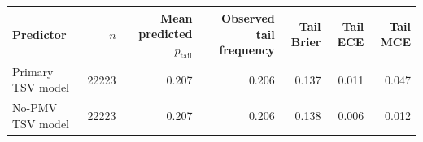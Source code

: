 \begin{tabular}{lrrrrrr}
\toprule
Predictor & $n$ & Mean predicted $p_{\mathrm{tail}}$ & Observed tail frequency & Tail Brier & Tail ECE & Tail MCE \\
\midrule
Primary TSV model & 22223 & 0.207 & 0.206 & 0.137 & 0.011 & 0.047 \\
No-PMV TSV model & 22223 & 0.207 & 0.206 & 0.138 & 0.006 & 0.012 \\
\bottomrule
\end{tabular}
